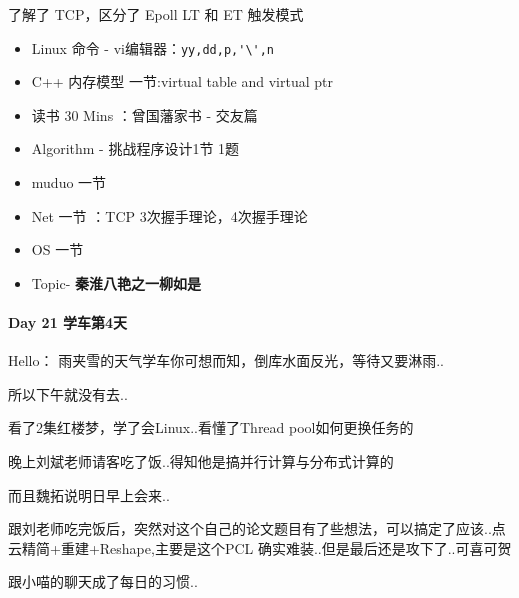 \documentclass[UTF8,a4paper,8pt]{ctexart}
\begin{document}
	 	 了解了 TCP，区分了 Epoll LT 和 ET 触发模式
	 	 \begin{itemize}
	 	 	\item  \makebox[0pt][l]{$\square$}\raisebox{.15ex}{\hspace{0.1em}$\checkmark$} Linux 命令 - vi编辑器：\verb|yy,dd,p,'\',n|
	 	 	\item  \makebox[0pt][l]{$\square$}\raisebox{.15ex}{\hspace{0.1em}$\checkmark$} C++ 内存模型 一节:virtual table
 and virtual ptr 	 	 	
	 	 	\item  \makebox[0pt][l]{$\square$}\raisebox{.15ex}{\hspace{0.1em}$\checkmark$} 读书  30 Mins	：曾国藩家书 - 交友篇	 	 
	 	 	\item  \makebox[0pt][l]{$\square$}\raisebox{.15ex}{\hspace{0.1em}$\checkmark$} Algorithm - 挑战程序设计1节 1题
	 	 	\item  muduo 一节
	 	 	\item  \makebox[0pt][l]{$\square$}\raisebox{.15ex}{\hspace{0.1em}$\checkmark$} Net 一节 ：TCP 3次握手理论，4次握手理论
	 	 	\item  OS  一节
	 	 	
	 	 	\item  \makebox[0pt][l]{$\square$}\raisebox{.15ex}{\hspace{0.1em}$\checkmark$} Topic- \textbf{秦淮八艳之一柳如是}
	 	 \end{itemize}
 	 \paragraph{Day 21  学车第4天    \quad     }Hello：
	 	 雨夹雪的天气学车你可想而知，倒库水面反光，等待又要淋雨..
	 	 
	 	 所以下午就没有去..
	 	 
	 	 看了2集红楼梦，学了会Linux..看懂了Thread pool如何更换任务的
	 	 
	 	 晚上刘斌老师请客吃了饭..得知他是搞并行计算与分布式计算的
	 	 
	 	 而且魏拓说明日早上会来..
	 	 
	 	 跟刘老师吃完饭后，突然对这个自己的论文题目有了些想法，可以搞定了应该..点云精简+重建+Reshape,主要是这个PCL 确实难装..但是最后还是攻下了..可喜可贺
	 	 
	 	 跟小喵的聊天成了每日的习惯..
 	 
\end{document}
